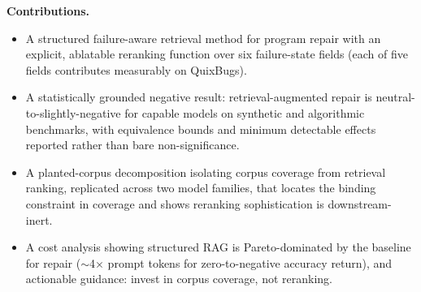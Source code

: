 \smallskip
\noindent\textbf{Contributions.}
\begin{itemize}
  \item A structured failure-aware retrieval method for program repair with an
    explicit, ablatable reranking function over six failure-state fields
    (each of five fields contributes measurably on QuixBugs).
  \item A statistically grounded negative result: retrieval-augmented repair
    is neutral-to-slightly-negative for capable models on synthetic and
    algorithmic benchmarks, with equivalence bounds and minimum detectable
    effects reported rather than bare non-significance.
  \item A planted-corpus decomposition isolating corpus coverage from
    retrieval ranking, replicated across two model families, that locates the
    binding constraint in coverage and shows reranking sophistication is
    downstream-inert.
  \item A cost analysis showing structured RAG is Pareto-dominated by the
    baseline for repair ($\sim$4$\times$ prompt tokens for zero-to-negative
    accuracy return), and actionable guidance: invest in corpus coverage, not
    reranking.
\end{itemize}
